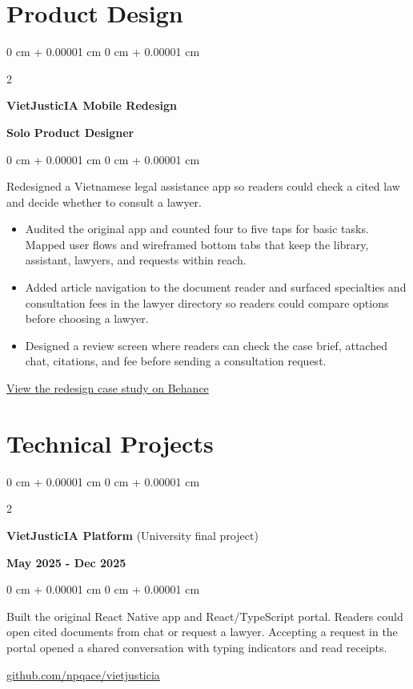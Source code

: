 \documentclass[11pt, letterpaper]{article}
\newenvironment{highlights}{
    \begin{itemize}[
        topsep=0.05 cm,  
        parsep=0.05 cm,  
        partopsep=0pt,
        itemsep=0pt,
        leftmargin=0 cm + 10pt
    ]
}{
    \end{itemize}
}
\newenvironment{onecolentry}{
    \begin{adjustwidth}{
        0 cm + 0.00001 cm
    }{
        0 cm + 0.00001 cm
    }
}{
    \end{adjustwidth}
}
\newenvironment{twocolentry}[2][]{
    \onecolentry
    \def\secondColumn{#2}
    \setcolumnwidth{\fill, 4.5 cm}
    \begin{paracol}{2}
}{
    \switchcolumn \raggedleft \secondColumn
    \end{paracol}
    \endonecolentry
}
\begin{document}
    \section{Product Design}
    \begin{twocolentry}{\textbf{Solo Product Designer}}
        \textbf{\large VietJusticIA Mobile Redesign}
    \end{twocolentry}
    \begin{onecolentry}
        Redesigned a Vietnamese legal assistance app so readers could check a cited law and decide whether to consult a lawyer.
        \begin{highlights}
            \item Audited the original app and counted four to five taps for basic tasks. Mapped user flows and wireframed bottom tabs that keep the library, assistant, lawyers, and requests within reach.
            \item Added article navigation to the document reader and surfaced specialties and consultation fees in the lawyer directory so readers could compare options before choosing a lawyer.
            \item Designed a review screen where readers can check the case brief, attached chat, citations, and fee before sending a consultation request.
        \end{highlights}
        \href{https://www.behance.net/gallery/258814687/VietJusticIA-AI-Legal-Tech-Mobile-App-Redesign}{View the redesign case study on Behance}
    \end{onecolentry}

    \section{Technical Projects}
    \begin{twocolentry}{\textbf{May 2025 - Dec 2025}}
        \textbf{VietJusticIA Platform} (University final project)
    \end{twocolentry}
    \begin{onecolentry}
        Built the original React Native app and React/TypeScript portal. Readers could open cited documents from chat or request a lawyer. Accepting a request in the portal opened a shared conversation with typing indicators and read receipts.\par
        \href{https://github.com/npqace/vietjusticia}{github.com/npqace/vietjusticia}
    \end{onecolentry}
\end{document}
